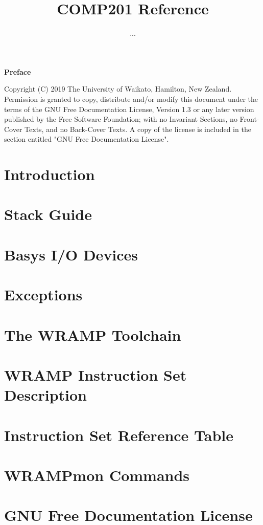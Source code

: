 \documentclass[a4paper]{book}
\title{COMP201 Reference}
\author{...}
\begin{document}

\begin{Huge}
\vspace{2cm}
\textbf{Preface}\\
\vspace{1.5cm}
\end{Huge}




Copyright (C) 2019 The University of Waikato, Hamilton, New Zealand.
Permission is granted to copy, distribute and/or modify this document
under the terms of the GNU Free Documentation License, Version 1.3
or any later version published by the Free Software Foundation;
with no Invariant Sections, no Front-Cover Texts, and no Back-Cover Texts.
A copy of the license is included in the section entitled "GNU
Free Documentation License".

\tableofcontents

\chapter{Introduction}
\label{chapter:intro}

\chapter{Stack Guide}
\label{chapter:stack}

\chapter{Basys I/O Devices}
\label{chapter:io}

\chapter{Exceptions}
\label{chapter:exceptions}

\appendix
\chapter{The WRAMP Toolchain}
\label{appendix:toolchain}

\chapter{WRAMP Instruction Set Description}
\label{appendix:instr}

\chapter{Instruction Set Reference Table}
\label{appendix:instrsm}
\addtolength{\hoffset}{-1cm}
\addtolength{\textwidth}{1cm}

\chapter{WRAMPmon Commands}
\label{appendix:wrampmon}


\chapter{GNU Free Documentation License}
\label{appendix:license}

\end{document}
